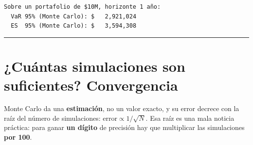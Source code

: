 \documentclass[
  spanish,
  letterpaper,
  DIV=11,
  numbers=noendperiod]{scrreprt}
\begin{document}
\begin{verbatim}
Sobre un portafolio de $10M, horizonte 1 año:
  VaR 95% (Monte Carlo): $   2,921,024
  ES  95% (Monte Carlo): $   3,594,308
\end{verbatim}

\begin{center}\rule{0.5\linewidth}{0.5pt}\end{center}

\chapter{¿Cuántas simulaciones son suficientes?
Convergencia}\label{cuuxe1ntas-simulaciones-son-suficientes-convergencia}

Monte Carlo da una \textbf{estimación}, no un valor exacto, y su error
decrece con la raíz del número de simulaciones:
\(\text{error} \propto 1/\sqrt{N}\). Esa raíz es una mala noticia
práctica: para ganar \textbf{un dígito} de precisión hay que multiplicar
las simulaciones \textbf{por 100}.
\end{document}
